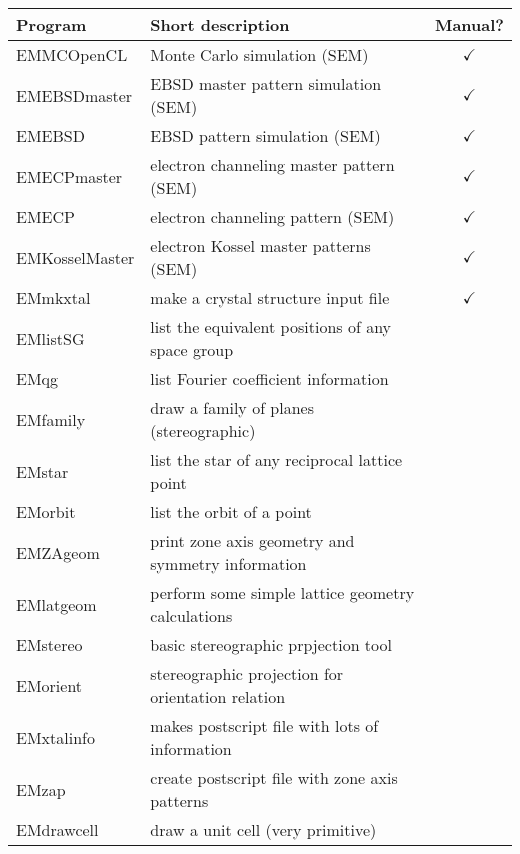 \documentclass[DIV=calc, paper=letter, fontsize=11pt]{scrartcl}	 %
\begin{document}
\begin{table*}[h]
\centering\leavevmode
\begin{tabular}{|l|l|c|}
\hline
Program & Short description & Manual? \\
\hline\hline
  \textsf{EMMCOpenCL} & Monte Carlo simulation (SEM) & $\checkmark$\\
  \textsf{EMEBSDmaster} & EBSD master pattern simulation (SEM) & $\checkmark$\\
  \textsf{EMEBSD} & EBSD pattern simulation (SEM) & $\checkmark$\\
  \textsf{EMECPmaster} & electron channeling master pattern (SEM) & $\checkmark$\\
  \textsf{EMECP} & electron channeling pattern (SEM) & $\checkmark$\\
  \textsf{EMKosselMaster} & electron Kossel master patterns (SEM) & $\checkmark$ \\
\hline
  \textsf{EMmkxtal} & make a crystal structure input file& $\checkmark$\\
  \textsf{EMlistSG} & list the equivalent positions of any space group & \\
  \textsf{EMqg} & list Fourier coefficient information & \\
  \textsf{EMfamily} & draw a family of planes (stereographic) & \\
  \textsf{EMstar} & list the star of any reciprocal lattice point & \\
  \textsf{EMorbit} & list the orbit of a point & \\
  \textsf{EMZAgeom} & print zone axis geometry and symmetry information & \\
  \textsf{EMlatgeom} & perform some simple lattice geometry calculations & \\
  \textsf{EMstereo} & basic stereographic prpjection tool & \\
  \textsf{EMorient} & stereographic projection for orientation relation & \\
  \textsf{EMxtalinfo} & makes postscript file with lots of information & \\
  \textsf{EMzap} & create postscript file with zone axis patterns & \\
  \textsf{EMdrawcell} & draw a unit cell (very primitive) & \\
\hline
\end{tabular}
\end{table*}
\end{document}
